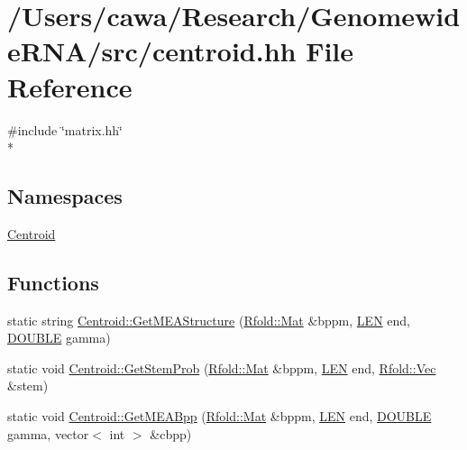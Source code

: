 \hypertarget{centroid_8hh}{\section{/\+Users/cawa/\+Research/\+Genomewide\+R\+N\+A/src/centroid.hh File Reference}
\label{centroid_8hh}
}
{\ttfamily \#include \char`\"{}matrix.\+hh\char`\"{}}\\*
\subsection*{Namespaces}
\begin{DoxyCompactItemize}
\item 
 \hyperlink{namespace_centroid}{Centroid}
\end{DoxyCompactItemize}
\subsection*{Functions}
\begin{DoxyCompactItemize}
\item 
static string \hyperlink{namespace_centroid_a2472e4e4f8b057695c4dc82a1296a750}{Centroid\+::\+Get\+M\+E\+A\+Structure} (\hyperlink{namespace_rfold_a6392dbfbc164230455fdcdb1a0ff53d7}{Rfold\+::\+Mat} \&bppm, \hyperlink{energy__const_8hh_a05b49c662c073f89e86804f7856622a0}{L\+E\+N} end, \hyperlink{energy__const_8hh_a8747af38b86aa2bbcda2f1b1aa0888c2}{D\+O\+U\+B\+L\+E} gamma)
\item 
static void \hyperlink{namespace_centroid_a1536a120dbc969d6a6702ae758427555}{Centroid\+::\+Get\+Stem\+Prob} (\hyperlink{namespace_rfold_a6392dbfbc164230455fdcdb1a0ff53d7}{Rfold\+::\+Mat} \&bppm, \hyperlink{energy__const_8hh_a05b49c662c073f89e86804f7856622a0}{L\+E\+N} end, \hyperlink{namespace_rfold_aaf02f2c0c40c1dd572dbdd8bc1bde67d}{Rfold\+::\+Vec} \&stem)
\item 
static void \hyperlink{namespace_centroid_a4bed069b4230a7f988bf8ed45b96a605}{Centroid\+::\+Get\+M\+E\+A\+Bpp} (\hyperlink{namespace_rfold_a6392dbfbc164230455fdcdb1a0ff53d7}{Rfold\+::\+Mat} \&bppm, \hyperlink{energy__const_8hh_a05b49c662c073f89e86804f7856622a0}{L\+E\+N} end, \hyperlink{energy__const_8hh_a8747af38b86aa2bbcda2f1b1aa0888c2}{D\+O\+U\+B\+L\+E} gamma, vector$<$ int $>$ \&cbpp)
\end{DoxyCompactItemize}
